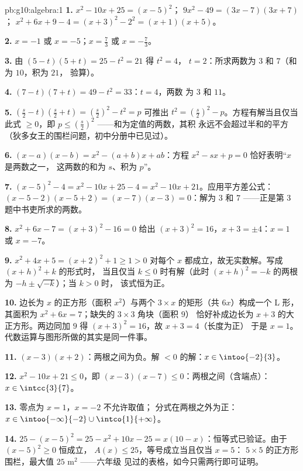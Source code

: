 \begin{solution}{pb:g10:algebra:1}
\textbf{1.} $x^2 - 10x + 25 = (x - 5)^2$；
$9x^2 - 49 = (3x - 7)(3x + 7)$；
$x^2 + 6x + 9 - 4 = (x + 3)^2 - 2^2 = (x + 1)(x + 5)$。

\textbf{2.} $x = -1$ 或 $x = -5$；\quad $x = \frac73$ 或
$x = -\frac73$。

\textbf{3.} 由 $(5 - t)(5 + t) = 25 - t^2 = 21$ 得 $t^2 = 4$，
$t = 2$：所求两数为 $3$ 和 $7$（和为 $10$，积为 $21$，
验算）。

\textbf{4.} $(7 - t)(7 + t) = 49 - t^2 = 33$：$t = 4$，两数
为 $3$ 和 $11$。

\textbf{5.} $\left(\frac s2 - t\right)\left(\frac s2 + t\right)
= \left(\frac s2\right)^2 - t^2 = p$ 可推出
$t^2 = \left(\frac s2\right)^2 - p$。方程有解当且仅当
此式 $\geq 0$，即
$p \leq \left(\frac s2\right)^2$ ——和为定值的两数，其积
永远不会超过半和的平方
（狄多女王的围栏问题，初中分册中已见过）。

\textbf{6.} $(x - a)(x - b) = x^2 - (a + b)x + ab$：方程
$x^2 - sx + p = 0$ 恰好表明“$x$ 是两数之一，
这两数的和为 $s$、积为 $p$”。

\textbf{7.} $(x-5)^2 - 4 = x^2 - 10x + 25 - 4 = x^2 - 10x +
21$。应用平方差公式：
$(x - 5 - 2)(x - 5 + 2) = (x - 7)(x - 3) = 0$：解为 $3$
和 $7$ ——正是第 3 题中书吏所求的两数。

\textbf{8.} $x^2 + 6x - 7 = (x + 3)^2 - 16 = 0$ 给出
$(x + 3)^2 = 16$，$x + 3 = \pm 4$：$x = 1$ 或 $x = -7$。

\textbf{9.} $x^2 + 4x + 5 = (x + 2)^2 + 1 \geq 1 > 0$ 对每个
$x$ 都成立，故无实数解。写成 $(x + h)^2 + k$ 的形式时，
当且仅当 $k \leq 0$ 时有解（此时 $(x+h)^2 = -k$ 的两根
为 $-h \pm \sqrt{-k}$）；当 $k > 0$ 时，
该式恒为正。

\textbf{10.} 边长为 $x$ 的正方形（面积 $x^2$）与两个
$3 \times x$ 的矩形（共 $6x$）构成一个 L 形，其面积为
$x^2 + 6x = 7$；缺失的 $3 \times 3$ 角块（面积 $9$）
恰好补成边长为 $x + 3$ 的大正方形。两边同加 $9$
得 $(x + 3)^2 = 16$，故 $x + 3 = 4$（长度为正）
于是 $x = 1$。代数运算与图形所做的其实是同一件事。

\textbf{11.} $(x-3)(x+2)$：两根之间为负。解
$< 0$ 的解：$x \in \intoo{-2}{3}$。

\textbf{12.} $x^2 - 10x + 21 \leq 0$，即
$(x - 3)(x - 7) \leq 0$：两根之间（含端点）：
$x \in \intcc{3}{7}$。

\textbf{13.} 零点为 $x = 1$，$x = -2$ 不允许取值；
分式在两根之外为正：
$x \in \intoo{-\infty}{-2} \cup \intco{1}{+\infty}$。

\textbf{14.} $25 - (x - 5)^2 = 25 - x^2 + 10x - 25 =
x(10 - x)$：恒等式已验证。由于 $(x-5)^2 \geq 0$ 恒成立，
$A(x) \leq 25$，等号成立当且仅当 $x = 5$：
$5 \times 5$ 的正方形围栏，最大值 $25$ m$^2$ ——六年级
见过的表格，如今只需两行即可证明。


\end{solution}
